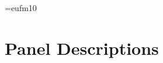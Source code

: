 




\newcommand{\be}{\begin{equation}}
\newcommand{\ee}{\end{equation}}
\newcommand{\ben}{\begin{displaymath}}
\newcommand{\een}{\end{displaymath}}
\newcommand{\qed}{
\begin{flushright}
{\mbox{$\Box$}}\end{flushright}\vspace{.25in}}

\font\setfont=eufm10

\newtheorem{theorem}{Theorem}[section]
\newtheorem{corollary}{Corollary}[section]
\newtheorem{prop}{Proposition}[section]
\newcommand{\proof}{{\bf Proof:} }
\newcommand{\realf}{\mbox{{\bf R}$^3$}}
\newcommand{\plane}{\mbox{{\bf R}$^2$}}
\newcommand{\realn}{\mbox{{\bf R}$^n$}}
\newcommand{\gameq}{\mbox{$\Gamma$-equivariant }}
\newcommand{\dstool}{\mbox{\bf dstool}}
\newcommand{\pvf}{\mbox{$u^{\prime}=P^Q(u)$}}
\newcommand{\group}{\mbox{\setfont G}}
\newcommand{\property}{\mbox{\setfont P}}
\newcommand{\real}{{\mbox{I} \hspace{-.03in} {\bf R} }}


 
\oddsidemargin 0.25in
\topmargin 0.25in
\headheight 0.25in

\textwidth 6in
\headsep 0in
\textheight 8.25in




\section{Panel Descriptions}

